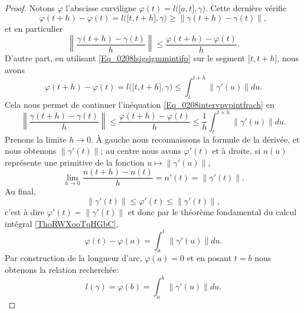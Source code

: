 \begin{proof}
    Notons $\varphi$ l'abscisse curviligne $\varphi(t)=l\big( \mathopen[ a , t \mathclose],\gamma \big)$. Cette dernière vérifie
    \begin{equation}
        \varphi(t+h)-\varphi(t)=l\big( \mathopen[ t , t+h \mathclose],\gamma \big)\geq \| \gamma(t+h)-\gamma(t) \|,
    \end{equation}
    et en particulier
    \begin{equation}     \label{Eq_0208intervpvpintfrach}
        \left\| \frac{ \gamma(t+h)-\gamma(t) }{ h } \right\|\leq \frac{ \varphi(t+h)-\varphi(t) }{ h }.
    \end{equation}
    D'autre part, en utilisant \eqref{Eq_0208lsigsigmmintifp} sur le segment $\mathopen[ t , t+h \mathclose]$, nous avons
    \begin{equation}
        \varphi(t+h)-\varphi(t)=l\big( \mathopen[ t , t+h \mathclose],\gamma \big)\leq\int_{t}^{t+h}\| \gamma'(u) \|du.
    \end{equation}
    Cela nous permet de continuer l'inéquation \eqref{Eq_0208intervpvpintfrach} en
    \begin{equation}
        \left\| \frac{ \gamma(t+h)-\gamma(t) }{ h } \right\|\leq\frac{ \varphi(t+h)-\varphi(t) }{ h }\leq\frac{1}{ h }\int_t^{t+h}\| \gamma'(u) \|du.
    \end{equation}
    Prenons la limite $h\to 0$. À gauche nous reconnaissons la formule de la dérivée, et nous obtenons $\| \gamma'(t) \|$; au centre nous avons $\varphi'(t)$ et à droite, si $n(u)$ représente une primitive de la fonction $u\mapsto\| \gamma'(u) \|$,
    \begin{equation}
        \lim_{h\to 0}\frac{ n(t+h)-n(t) }{ h }=n'(t)=\| \gamma'(t) \|.
    \end{equation}
    Au final, 
    \begin{equation}
        \| \gamma'(t) \|\leq \varphi'(t)\leq\| \gamma'(t) \|,
    \end{equation}
    c'est à dire $\varphi'(t)=\| \gamma'(t) \|$ et donc par le théorème fondamental du calcul intégral \ref{ThoRWXooTqHGbC},
    \begin{equation}
        \varphi(t)-\varphi(a)=\int_a^t\| \gamma'(u) \|du.
    \end{equation}
    Par construction de la longueur d'arc, $\varphi(a)=0$ et en posant $t=b$ nous obtenons la relation recherchée:
    \begin{equation}
        l(\gamma)=\varphi(b)=\int_a^b\| \gamma'(u) \|du.
    \end{equation}
\end{proof}

